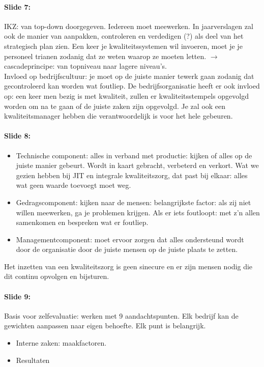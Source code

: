 \documentclass[10pt,a4paper]{report}
\begin{document}
\paragraph{Slide 7:} IKZ: van top-down doorgegeven. Iedereen moet meewerken. In jaarverslagen zal ook de manier van aanpakken, controleren en verdedigen (?) als deel van het strategisch plan zien.
Een keer je kwaliteitssystemen wil invoeren, moet je je personeel trianen zodanig dat ze weten waarop ze moeten letten. $\rightarrow$ cascadeprincipe: van topniveau naar lagere niveau's.\\
Invloed op bedrijfscultuur: je moet op de juiste manier tewerk gaan zodanig dat gecontroleerd kan worden wat foutliep. De bedrijfsorganisatie heeft er ook invloed op: een keer men bezig is met kwaliteit, zullen er kwaliteitsstempels opgevolgd worden om na te gaan of de juiste zaken zijn opgevolgd. Je zal ook een kwaliteitsmanager hebben die verantwoordelijk is voor het hele gebeuren.

\paragraph{Slide 8:}
\begin{itemize}
\item Technische component: alles in verband met productie: kijken of alles op de juiste manier gebeurt. Wordt in kaart gebracht, verbeterd en verkort. Wat we gezien hebben bij JIT en integrale kwaliteitszorg, dat past bij elkaar: alles wat geen waarde toevoegt moet weg.
\item Gedragscomponent: kijken naar de mensen: belangrijkste factor: als zij niet willen meewerken, ga je problemen krijgen. Als er iets foutloopt: met z'n allen samenkomen en bespreken wat er foutliep.
\item Managementcomponent: moet ervoor zorgen dat alles ondersteund wordt door de organisatie door de juiste mensen op de juiste plaats te zetten.
\end{itemize}
Het inzetten van een kwaliteitszorg is geen sinecure en er zijn mensen nodig die dit continu opvolgen en bijsturen.

\paragraph{Slide 9:} Basis voor zelfevaluatie: werken met 9 aandachtspunten. Elk bedrijf kan de gewichten aanpassen naar eigen behoefte. Elk punt is belangrijk.
\begin{itemize}
\item Interne zaken: maakfactoren. 
\item Resultaten
\end{itemize}
\end{document}
